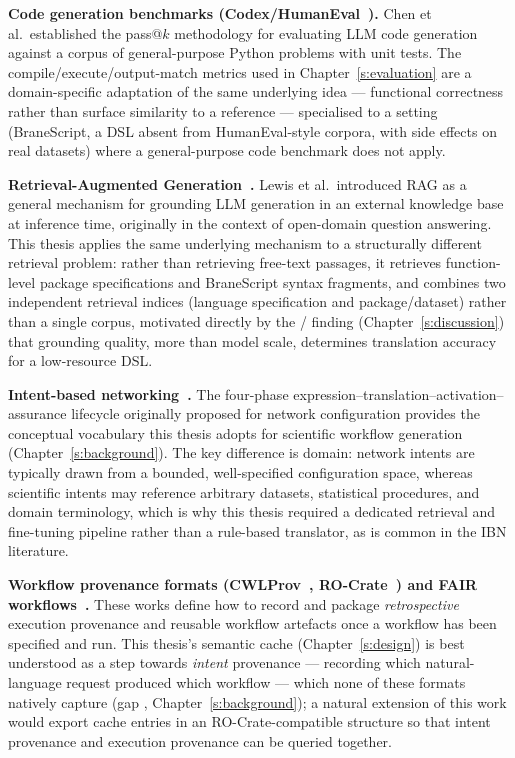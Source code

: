 \textbf{Code generation benchmarks (Codex/HumanEval~\cite{chen2021evaluating}).}
Chen et al.\ established the pass@$k$ methodology for evaluating LLM code
generation against a corpus of general-purpose Python problems with unit
tests. The compile/execute/output-match metrics used in
Chapter~\ref{s:evaluation} are a domain-specific adaptation of the same
underlying idea --- functional correctness rather than surface similarity to a
reference --- specialised to a setting (BraneScript, a DSL absent from
HumanEval-style corpora, with side effects on real datasets) where a
general-purpose code benchmark does not apply.

\textbf{Retrieval-Augmented Generation~\cite{lewis2020rag}.} Lewis et al.\
introduced RAG as a general mechanism for grounding LLM generation in an
external knowledge base at inference time, originally in the context of
open-domain question answering. This thesis applies the same underlying
mechanism to a structurally different retrieval problem: rather than
retrieving free-text passages, it retrieves function-level package
specifications and BraneScript syntax fragments, and combines two
independent retrieval indices (language specification and
package/dataset) rather than a single corpus, motivated directly by the
\rqref{1}/\rqref{2} finding (Chapter~\ref{s:discussion}) that grounding quality, more than
model scale, determines translation accuracy for a low-resource DSL.

\textbf{Intent-based networking~\cite{bn2016ibn}.} The four-phase
expression--translation--activation--assurance lifecycle originally proposed
for network configuration provides the conceptual vocabulary this thesis
adopts for scientific workflow generation (Chapter~\ref{s:background}). The
key difference is domain: network intents are typically drawn from a bounded,
well-specified configuration space, whereas scientific intents may reference
arbitrary datasets, statistical procedures, and domain terminology, which is
why this thesis required a dedicated retrieval and fine-tuning pipeline rather
than a rule-based translator, as is common in the IBN literature.

\textbf{Workflow provenance formats
(CWLProv~\cite{soiland2018cwlprov}, RO-Crate~\cite{soiland2022rocrate}) and
FAIR workflows~\cite{goble2020fair}.} These works define how to record and
package \emph{retrospective} execution provenance and reusable workflow
artefacts once a workflow has been specified and run. This thesis's semantic
cache (Chapter~\ref{s:design}) is best understood as a step towards
\emph{intent} provenance --- recording which natural-language request produced
which workflow --- which none of these formats natively capture (gap \gap{1},
Chapter~\ref{s:background}); a natural extension of this work would export
cache entries in an RO-Crate-compatible structure so that intent provenance
and execution provenance can be queried together.
